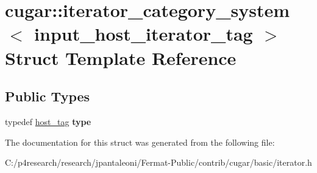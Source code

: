 \hypertarget{structcugar_1_1iterator__category__system_3_01input__host__iterator__tag_01_4}{}\section{cugar\+:\+:iterator\+\_\+category\+\_\+system$<$ input\+\_\+host\+\_\+iterator\+\_\+tag $>$ Struct Template Reference}
\label{structcugar_1_1iterator__category__system_3_01input__host__iterator__tag_01_4}
\subsection*{Public Types}
\begin{DoxyCompactItemize}
\item 
\mbox{\label{structcugar_1_1iterator__category__system_3_01input__host__iterator__tag_01_4_a3168632fca64e3ed3a3c03462fb72ace}} 
typedef \hyperlink{structcugar_1_1host__tag}{host\+\_\+tag} {\bfseries type}
\end{DoxyCompactItemize}


The documentation for this struct was generated from the following file\+:\begin{DoxyCompactItemize}
\item 
C\+:/p4research/research/jpantaleoni/\+Fermat-\/\+Public/contrib/cugar/basic/iterator.\+h\end{DoxyCompactItemize}
